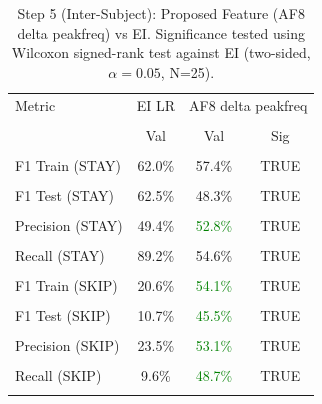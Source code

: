 \begin{table}[H]
\centering
\begin{tabular}{lccc}
\hline
Metric & EI LR & \multicolumn{2}{c}{AF8 delta peakfreq} \\\\
 & Val & Val & Sig \\\\
\hline
F1 Train (STAY) & 62.0\% & 57.4\% & TRUE \\\\
F1 Test (STAY) & 62.5\% & 48.3\% & TRUE \\\\
Precision (STAY) & 49.4\% & \textcolor{green}{52.8\%} & TRUE \\\\
Recall (STAY) & 89.2\% & 54.6\% & TRUE \\\\
F1 Train (SKIP) & 20.6\% & \textcolor{green}{54.1\%} & TRUE \\\\
F1 Test (SKIP) & 10.7\% & \textcolor{green}{45.5\%} & TRUE \\\\
Precision (SKIP) & 23.5\% & \textcolor{green}{53.1\%} & TRUE \\\\
Recall (SKIP) & 9.6\% & \textcolor{green}{48.7\%} & TRUE \\\\
\hline
\end{tabular}
\caption{Step 5 (Inter-Subject): Proposed Feature (AF8 delta peakfreq) vs EI. Significance tested using Wilcoxon signed-rank test against EI (two-sided, $\alpha=0.05$, N=25).}
\label{tab:metrics_5_inter_2}
\end{table}